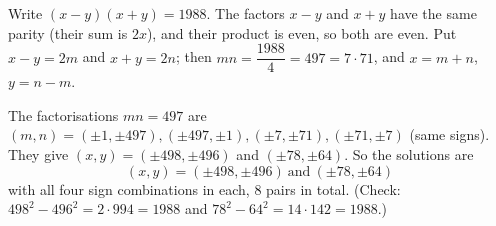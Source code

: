Write $(x-y)(x+y)=1988$. The factors $x-y$ and $x+y$ have the same parity (their sum is $2x$), and their product is even, so both are even. Put $x-y=2m$ and $x+y=2n$; then $mn=\dfrac{1988}{4}=497=7\cdot71$, and $x=m+n$, $y=n-m$.

The factorisations $mn=497$ are $(m,n)=(\pm1,\pm497),(\pm497,\pm1),(\pm7,\pm71),(\pm71,\pm7)$ (same signs). They give $(x,y)=(\pm498,\pm496)$ and $(\pm78,\pm64)$. So the solutions are
\[
\boxed{(x,y)=(\pm498,\pm496)\ \text{and}\ (\pm78,\pm64)}
\]
with all four sign combinations in each, $8$ pairs in total. (Check: $498^2-496^2=2\cdot994=1988$ and $78^2-64^2=14\cdot142=1988$.)
